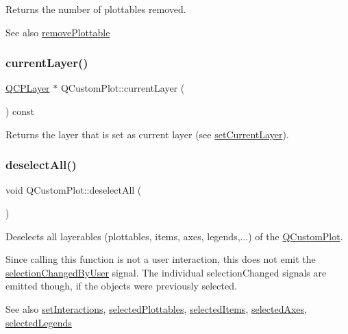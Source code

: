 Returns the number of plottables removed.

\begin{DoxySeeAlso}{See also}
\hyperlink{class_q_custom_plot_af3dafd56884208474f311d6226513ab2}{remove\+Plottable} 
\end{DoxySeeAlso}
\mbox{\label{class_q_custom_plot_a0421d647f420b0b4c57aec1708857af5}} 
\subsubsection{\texorpdfstring{current\+Layer()}{currentLayer()}}
{\footnotesize\ttfamily \hyperlink{class_q_c_p_layer}{Q\+C\+P\+Layer} $\ast$ Q\+Custom\+Plot\+::current\+Layer (\begin{DoxyParamCaption}{ }\end{DoxyParamCaption}) const}

Returns the layer that is set as current layer (see \hyperlink{class_q_custom_plot_a73a6dc47c653bb6f8f030abca5a11852}{set\+Current\+Layer}). \mbox{\label{class_q_custom_plot_a9d4808ab925b003054085246c92a257c}} 
\subsubsection{\texorpdfstring{deselect\+All()}{deselectAll()}}
{\footnotesize\ttfamily void Q\+Custom\+Plot\+::deselect\+All (\begin{DoxyParamCaption}{ }\end{DoxyParamCaption})}

Deselects all layerables (plottables, items, axes, legends,...) of the \hyperlink{class_q_custom_plot}{Q\+Custom\+Plot}.

Since calling this function is not a user interaction, this does not emit the \hyperlink{class_q_custom_plot_a500c64a109bc773c973ad274f2fa4190}{selection\+Changed\+By\+User} signal. The individual selection\+Changed signals are emitted though, if the objects were previously selected.

\begin{DoxySeeAlso}{See also}
\hyperlink{class_q_custom_plot_a5ee1e2f6ae27419deca53e75907c27e5}{set\+Interactions}, \hyperlink{class_q_custom_plot_a747faaab57c56891e901a1e97fa4359a}{selected\+Plottables}, \hyperlink{class_q_custom_plot_afda487bcf2d6cf1a57173d82495e29ba}{selected\+Items}, \hyperlink{class_q_custom_plot_a7e6b07792b1cb2c31681596582d14dbe}{selected\+Axes}, \hyperlink{class_q_custom_plot_ac87624ddff1cbf4064781a8e8ae321c4}{selected\+Legends} 
\end{DoxySeeAlso}
\mbox{\label{class_q_custom_plot_a6ecae130f684b25276fb47bd3a5875c6}} 
